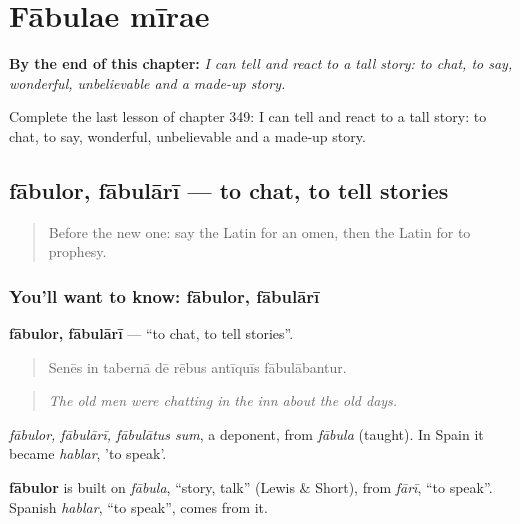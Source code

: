 
\chapter{Fābulae mīrae}
\label{ch:la-fabulae-mirae}

\begin{chapteropening}
\textbf{By the end of this chapter:} \emph{I can tell and react to a tall story: to chat, to say, wonderful, unbelievable and a made-up story.}

Complete the last lesson of chapter 349: I can tell and react to a tall story: to chat, to say, wonderful, unbelievable and a made-up story.
\end{chapteropening}

\section[fābulor, fābulārī]{fābulor, fābulārī — to chat, to tell stories}

\label{lesson:LA-C349-fabulor}



\begin{quote}
Before the new one: say the Latin for an omen, then the Latin for to prophesy.
\end{quote}

\subsection*{You'll want to know: fābulor, fābulārī}
\textbf{fābulor, fābulārī} — \textquotedblleft{}to chat, to tell stories\textquotedblright{}.

\begin{quote}
Senēs in tabernā dē rēbus antīquīs fābulābantur.
\end{quote}

\begin{quote}
\emph{The old men were chatting in the inn about the old days.}
\end{quote}

\emph{fābulor, fābulārī, fābulātus sum}, a deponent, from \emph{fābula} (taught). In Spain it became \emph{hablar}, 'to speak'.

\begin{cousinweb}
\textbf{fābulor} is built on \emph{fābula}, \textquotedblleft{}story, talk\textquotedblright{} (Lewis \& Short), from \emph{fārī}, \textquotedblleft{}to speak\textquotedblright{}. Spanish \emph{hablar}, \textquotedblleft{}to speak\textquotedblright{}, comes from it.
\end{cousinweb}

